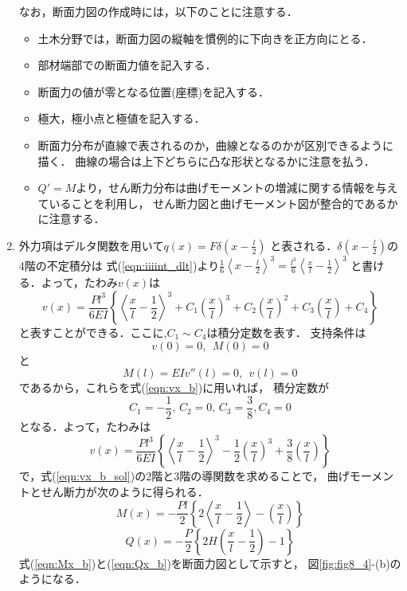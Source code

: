 \documentclass[10pt,a4j]{jbook}
\begin{document}
\begin{enumerate}
なお，断面力図の作成時には，以下のことに注意する．
\begin{itemize}
\item
	土木分野では，断面力図の縦軸を慣例的に下向きを正方向にとる．
\item
	部材端部での断面力値を記入する．
\item
	断面力の値が零となる位置(座標)を記入する．
\item
	極大，極小点と極値を記入する．
\item
	断面力分布が直線で表されるのか，曲線となるのかが区別できるように描く．
	曲線の場合は上下どちらに凸な形状となるかに注意を払う．
\item
	$Q'=M$より，せん断力分布は曲げモーメントの増減に関する情報を与えていることを利用し，
	せん断力図と曲げモーメント図が整合的であるかに注意する．
\end{itemize}
\item
外力項はデルタ関数を用いて$q(x)=F\delta\left(x-\frac{l}{2}\right)$
と表される．$\delta\left(x-\frac{l}{2}\right)$の4階の不定積分は
式(\ref{eqn:iiiint_dlt})より$\frac{1}{6}\left<x-\frac{l}{2}\right>^3=\frac{l^3}{6}\left<\frac{x}{l}-\frac{1}{2}\right>^3$
と書ける．よって，たわみ$v(x)$は
\begin{equation}
	v(x)= \frac{Pl^3}{6EI}\left\{
		\left<\frac{x}{l}-\frac{1}{2}\right>^3
		+
		C_1
		\left(\frac{x}{l}\right)^3
		+
		C_2
		\left(\frac{x}{l}\right)^2
		+
		C_3
		\left(\frac{x}{l}\right)
		+
		C_4
	\right\}
	\label{eqn:vx_b}
\end{equation}
と表すことができる．ここに,$C_1\sim C_4$は積分定数を表す．
支持条件は
\begin{equation}
	v(0)=0, \ \ M(0)=0
	\label{eqn:bcon_bl}
\end{equation}
と
\begin{equation}
	M(l)=EIv''(l)=0, \ \ v(l)=0
	\label{eqn:bcon_bl}
\end{equation}
であるから，これらを式(\ref{eqn:vx_b})に用いれば，
積分定数が
\begin{equation}
	C_1=-\frac{1}{2}, \, 
	C_2=0, \,
	C_3=\frac{3}{8}, C_4=0
\end{equation}
となる．よって，たわみは
\begin{equation}
	v(x)= \frac{Pl^3}{6EI}\left\{
		\left<\frac{x}{l}-\frac{1}{2}\right>^3
		-
		\frac{1}{2}
		\left(\frac{x}{l}\right)^3
		+
		\frac{3}{8}
		\left(\frac{x}{l}\right)
	\right\}
	\label{eqn:vx_b_sol}
\end{equation}
で，式(\ref{eqn:vx_b_sol})の2階と3階の導関数を求めることで，
曲げモーメントとせん断力が次のように得られる．
\begin{equation}
	M(x)= 
	-\frac{Pl}{2}\left\{
		2
		\left<\frac{x}{l}-\frac{1}{2}\right>
		-
		\left(\frac{x}{l}\right)
	\right\}
	\label{eqn:Mx_b}
\end{equation}
\begin{equation}
	Q(x)= 
	-\frac{P}{2}\left\{
		2H\left(\frac{x}{l}-\frac{1}{2}\right)
		-
		1
	\right\}
	\label{eqn:Qx_b}
\end{equation}
式(\ref{eqn:Mx_b})と(\ref{eqn:Qx_b})を断面力図として示すと，
図\ref{fig:fig8_4}-(b)のようになる．
\end{enumerate}
\end{document}
